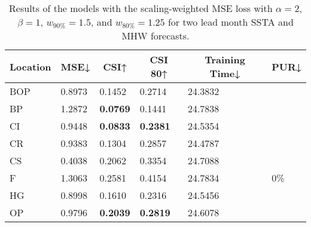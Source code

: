 \documentclass[11pt, a4paper]{article}
\begin{document}
\begin{table}[H]
\centering
\small
\caption{Results of the models with the scaling-weighted MSE loss with $\alpha=2$, $\beta=1$, $w_{90\%}=1.5$, and $w_{80\%}=1.25$ for two lead month SSTA and MHW forecasts.}
\begin{tabular}{llllll}
\multicolumn{1}{c}{\textbf{Location}} & \multicolumn{1}{c}{\textbf{MSE↓}} & \multicolumn{1}{c}{\textbf{CSI↑}} & \multicolumn{1}{c}{\textbf{CSI 80↑}} & \multicolumn{1}{c}{\textbf{Training Time↓}} & \multicolumn{1}{c}{\textbf{PUR↓}} \\ \hline
BOP                         & 0.8973                            & 0.1452                            & 0.2714                               & 24.3832                                     &                                   \\
BP                        & 1.2872                            & \textbf{0.0769}                   & 0.1441                               & 24.7838                                     &                                   \\
CI                        & 0.9448                            & \textbf{0.0833}                   & \textbf{0.2381}                      & 24.5354                                     &                                   \\
CR                           & 0.9383                            & 0.1304                            & 0.2857                               & 24.4787                                     &                                   \\
CS                           & 0.4038                            & 0.2062                            & 0.3354                               & 24.7088                                     &                                   \\
F                             & 1.3063                            & 0.2581                            & 0.4154                               & 24.7834                                     & 0\%                               \\
HG                          & 0.8998                            & 0.1610                            & 0.2316                               & 24.5456                                     &                                   \\
OP                       & 0.9796                            & \textbf{0.2039}                   & \textbf{0.2819}                      & 24.6078                                     &                                   \\

\end{tabular}
\end{table}
\end{document}
